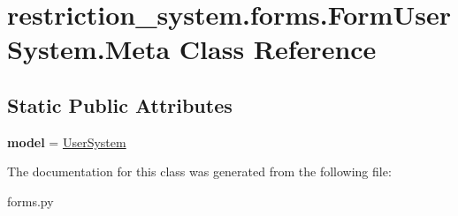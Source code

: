 \hypertarget{classrestriction__system_1_1forms_1_1FormUserSystem_1_1Meta}{}\section{restriction\+\_\+system.\+forms.\+Form\+User\+System.\+Meta Class Reference}
\label{classrestriction__system_1_1forms_1_1FormUserSystem_1_1Meta}
\subsection*{Static Public Attributes}
\begin{DoxyCompactItemize}
\item 
\hypertarget{classrestriction__system_1_1forms_1_1FormUserSystem_1_1Meta_a42bb6a0b7803a94acc9163fb2d79ae9a}{}{\bfseries model} = \hyperlink{classrestriction__system_1_1models_1_1UserSystem}{User\+System}\label{classrestriction__system_1_1forms_1_1FormUserSystem_1_1Meta_a42bb6a0b7803a94acc9163fb2d79ae9a}

\end{DoxyCompactItemize}


The documentation for this class was generated from the following file\+:\begin{DoxyCompactItemize}
\item 
forms.\+py\end{DoxyCompactItemize}
